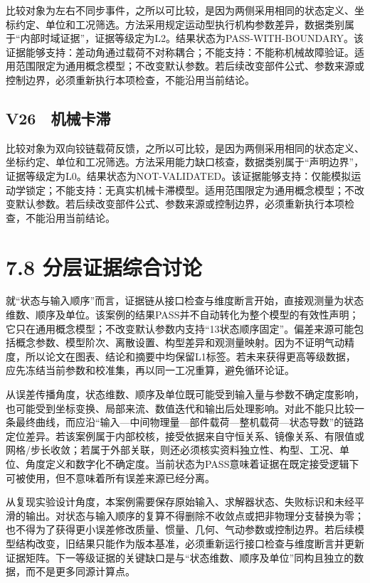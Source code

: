\documentclass[UTF8,12pt,openany]{ctexbook}
\begin{document}
比较对象为左右不同步事件，之所以可比较，是因为两侧采用相同的状态定义、坐标约定、单位和工况筛选。方法采用规定运动型执行机构参数差异，数据类别属于“内部时域证据”，证据等级定为L2。结果状态为PASS-WITH-BOUNDARY。该证据能够支持：差动角通过载荷不对称耦合；不能支持：不能称机械故障验证。适用范围限定为通用概念模型；不改变默认参数。若后续改变部件公式、参数来源或控制边界，必须重新执行本项检查，不能沿用当前结论。

\subsection{V26　机械卡滞}

比较对象为双向铰链载荷反馈，之所以可比较，是因为两侧采用相同的状态定义、坐标约定、单位和工况筛选。方法采用能力缺口核查，数据类别属于“声明边界”，证据等级定为L0。结果状态为NOT-VALIDATED。该证据能够支持：仅能模拟运动学锁定；不能支持：无真实机械卡滞模型。适用范围限定为通用概念模型；不改变默认参数。若后续改变部件公式、参数来源或控制边界，必须重新执行本项检查，不能沿用当前结论。



\section{7.8 分层证据综合讨论}


就“状态与输入顺序”而言，证据链从接口检查与维度断言开始，直接观测量为状态维数、顺序及单位。该案例的结果PASS并不自动转化为整个模型的有效性声明；它只在通用概念模型；不改变默认参数内支持“13状态顺序固定”。偏差来源可能包括概念参数、模型阶次、离散设置、构型差异和观测量映射。因为不证明气动精度，所以论文在图表、结论和摘要中均保留L1标签。若未来获得更高等级数据，应先冻结当前参数和校准集，再以同一工况重算，避免循环论证。

从误差传播角度，状态维数、顺序及单位既可能受到输入量与参数不确定度影响，也可能受到坐标变换、局部来流、数值迭代和输出后处理影响。对此不能只比较一条最终曲线，而应沿“输入—中间物理量—部件载荷—整机载荷—状态导数”的链路定位差异。若该案例属于内部校核，接受依据来自守恒关系、镜像关系、有限值或网格/步长收敛；若属于外部关联，则还必须核实资料独立性、构型、工况、单位、角度定义和数字化不确定度。当前状态为PASS意味着证据在既定接受逻辑下可被使用，但不意味着所有误差来源已经分离。

从复现实验设计角度，本案例需要保存原始输入、求解器状态、失败标识和未经平滑的输出。对状态与输入顺序的复算不得删除不收敛点或把非物理分支替换为零；也不得为了获得更小误差修改质量、惯量、几何、气动参数或控制边界。若后续模型结构改变，旧结果只能作为版本基准，必须重新运行接口检查与维度断言并更新证据矩阵。下一等级证据的关键缺口是与“状态维数、顺序及单位”同构且独立的数据，而不是更多同源计算点。
\end{document}
